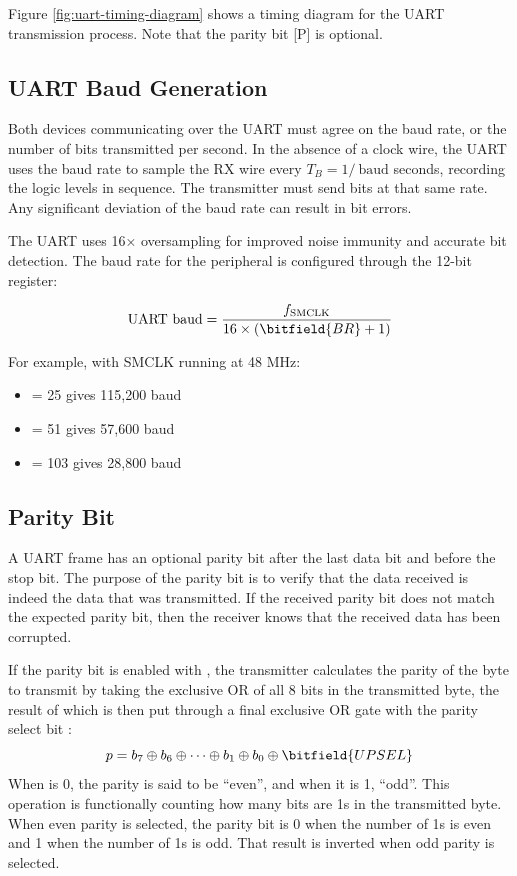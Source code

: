 Figure \ref{fig:uart-timing-diagram} shows a timing diagram for the UART transmission process. Note that the parity bit [P] is optional.



\subsection{UART Baud Generation}

Both devices communicating over the UART must agree on the baud rate, or the number of bits transmitted per second. In the absence of a clock wire, the UART uses the baud rate to sample the RX wire every $T_B = 1/\ \textrm{baud}$ seconds, recording the logic levels in sequence. The transmitter must send bits at that same rate. Any significant deviation of the baud rate can result in bit errors.

The UART uses 16× oversampling for improved noise immunity and accurate bit detection. The baud rate for the  peripheral is configured through the 12-bit  register:

\begin{equation*}
	\textrm{UART baud} = \frac{f_\textrm{SMCLK}}{16 \times (\bitfield{BR} + 1)}
\end{equation*}

For example, with SMCLK running at 48 MHz:
\begin{itemize}
	\item {} = 25 gives 115,200 baud
	\item {} = 51 gives 57,600 baud
	\item {} = 103 gives 28,800 baud
\end{itemize}



\subsection{Parity Bit}

A UART frame has an optional parity bit after the last data bit and before the stop bit. The purpose of the parity bit is to verify that the data received is indeed the data that was transmitted. If the received parity bit does not match the expected parity bit, then the receiver knows that the received data has been corrupted.

If the parity bit is enabled with , the transmitter calculates the parity of the byte to transmit by taking the exclusive OR of all 8 bits in the transmitted byte, the result of which is then put through a final exclusive OR gate with the parity select bit :
\begin{equation*}
p = b_7 \oplus b_6 \oplus \cdots \oplus b_1 \oplus b_0 \oplus \bitfield{UPSEL}
\end{equation*}
When  is 0, the parity is said to be ``even'', and when it is 1, ``odd''. This operation is functionally counting how many bits are 1s in the transmitted byte. When even parity is selected, the parity bit is 0 when the number of 1s is even and 1 when the number of 1s is odd. That result is inverted when odd parity is selected.

